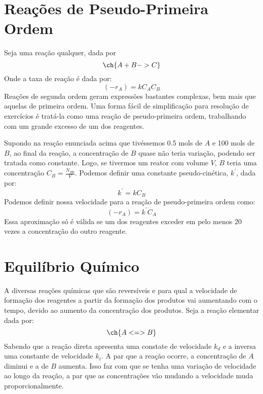 \section{Reações de Pseudo-Primeira Ordem}
Seja uma reação qualquer, dada por
\begin{equation}
    \ch{A + B -> C }
\end{equation}
Onde a taxa de reação é dada por:
\begin{equation}
    \left( -r_A \right) = k C_A C_B
\end{equation} 
Reações de segunda ordem geram expressões bastantes complexas, bem mais que aquelas de primeira
ordem. Uma forma fácil de simplificação para resolução de exercícios é tratá-la como uma reação de
pseudo-primeira ordem, trabalhando com um grande excesso de um dos reagentes. \par

Supondo na reação enunciada acima que tivéssemos 0.5 mols de \(A\) e 100 mols de \(B\), ao final da
reação, a concentração de \(B\) quase não teria variação, podendo ser tratada como constante. Logo,
se tivermos um reator com volume \(V\), \(B\) teria uma concentração \(C_B = \frac{N_{B0} }{V}\).
Podemos definir uma constante pseudo-cinética, \(k^{\prime} \), dada por:
\begin{equation}
    k^{\prime} = k C_B 
\end{equation}
Podemos definir nossa velocidade para a reação de pseudo-primeira ordem como:
\begin{equation}
    \left( -r_A \right) = k^{\prime} C_A
\end{equation}
Essa aproximação só é válida se um dos reagentes exceder em pelo menos 20 vezes a concentração do
outro reagente.  \par
\section{Equilíbrio Químico}
A diversas reações químicas que são reversíveis e para qual a velocidade de formação dos reagentes a
partir da formação dos produtos vai aumentando com o tempo, devido ao aumento da concentração dos
produtos. Seja a reação elementar dada por:
\begin{equation}
    \ch{A <=> B}
\end{equation}
Sabendo que a reação direta apresenta uma constate de velocidade \(k_d\) e a inversa uma constante
de velocidade \(k_i\). A par que a reação ocorre, a concentração de \(A\) diminui e a de \(B\)
aumenta. Isso faz com que se tenha uma variação de velocidade ao longo da reação, a par que as
concentrações vão mudando a velocidade muda proporcionalmente. \par

